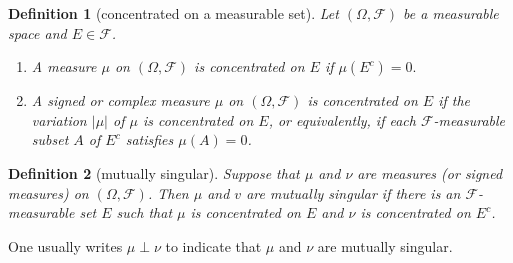 \documentclass{report}
\newtheorem{definition}{Definition}[section]
\theoremstyle{nonumberplain}
\begin{document}
\begin{definition}[concentrated on a measurable set]
	Let $(\Omega, \mathcal{F})$ be a measurable space and $E\in\mathcal{F}$.
	\begin{enumerate}
		\item A measure $\mu$ on $(\Omega, \mathcal{F})$ is \emph{concentrated on} $E$ if $\mu\left(E^{c}\right)=0 .$ 
		\item A signed or complex measure $\mu$ on $(\Omega, \mathcal{F})$ is \emph{concentrated on} $E$ if the variation $|\mu|$ of $\mu$ is concentrated on $E$, or equivalently, if each $\mathcal{F}$-measurable subset $A$ of $E^{c}$ satisfies $\mu(A)=0$.
	\end{enumerate}
\end{definition}

\begin{definition}[mutually singular]
	Suppose that $\mu$ and $\nu$ are measures (or signed measures) on $(\Omega, \mathcal{F})$. Then $\mu$ and $v$ are \emph{mutually singular} if there is an $\mathcal{F}$-measurable set $E$ such that $\mu$ is concentrated on $E$ and $\nu$ is concentrated on $E^{c}$.
\end{definition}
One usually writes $\mu \perp \nu$ to indicate that $\mu$ and $\nu$ are mutually singular.
\end{document}

